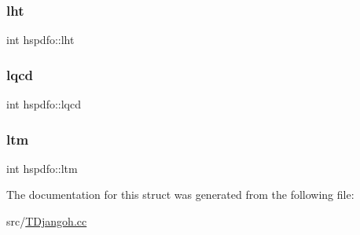 \subsubsection{\texorpdfstring{lht}{lht}}
{\footnotesize\ttfamily int hspdfo\+::lht}

\mbox{\label{structhspdfo_abb1f8dc8af851ad19309f43c5fa6bd31}} 
\subsubsection{\texorpdfstring{lqcd}{lqcd}}
{\footnotesize\ttfamily int hspdfo\+::lqcd}

\mbox{\label{structhspdfo_a1b51281dd57ff985568b4c7ca851231e}} 
\subsubsection{\texorpdfstring{ltm}{ltm}}
{\footnotesize\ttfamily int hspdfo\+::ltm}



The documentation for this struct was generated from the following file\+:\begin{DoxyCompactItemize}
\item 
src/\hyperlink{_t_djangoh_8cc}{T\+Djangoh.\+cc}\end{DoxyCompactItemize}
